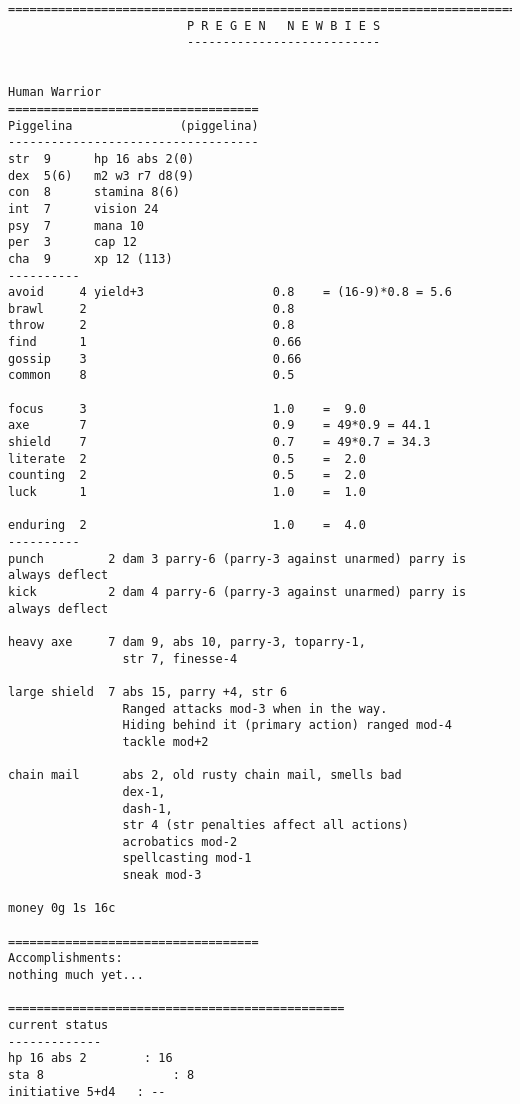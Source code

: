 \clearpage

\goodbreak
\tiny \begin{samepage} \begin{verbatim}
================================================================================
                         P R E G E N   N E W B I E S
                         ---------------------------

                         
Human Warrior
===================================
Piggelina               (piggelina)
-----------------------------------
str  9      hp 16 abs 2(0)
dex  5(6)   m2 w3 r7 d8(9)
con  8      stamina 8(6)
int  7      vision 24
psy  7      mana 10
per  3      cap 12
cha  9      xp 12 (113)
----------
avoid     4 yield+3                  0.8    = (16-9)*0.8 = 5.6
brawl     2                          0.8
throw     2                          0.8
find      1                          0.66
gossip    3                          0.66
common    8                          0.5

focus     3                          1.0    =  9.0
axe       7                          0.9    = 49*0.9 = 44.1
shield    7                          0.7    = 49*0.7 = 34.3
literate  2                          0.5    =  2.0
counting  2                          0.5    =  2.0
luck      1                          1.0    =  1.0

enduring  2                          1.0    =  4.0
----------
punch         2 dam 3 parry-6 (parry-3 against unarmed) parry is always deflect
kick          2 dam 4 parry-6 (parry-3 against unarmed) parry is always deflect

heavy axe     7 dam 9, abs 10, parry-3, toparry-1,
                str 7, finesse-4

large shield  7 abs 15, parry +4, str 6
                Ranged attacks mod-3 when in the way.
                Hiding behind it (primary action) ranged mod-4
                tackle mod+2

chain mail      abs 2, old rusty chain mail, smells bad
                dex-1,
                dash-1,
                str 4 (str penalties affect all actions)
                acrobatics mod-2
                spellcasting mod-1
                sneak mod-3

money 0g 1s 16c

===================================
Accomplishments:
nothing much yet...

===============================================
current status
-------------
hp 16 abs 2        : 16
sta 8                  : 8
initiative 5+d4   : --
\end{verbatim} \end{samepage} \normalsize



